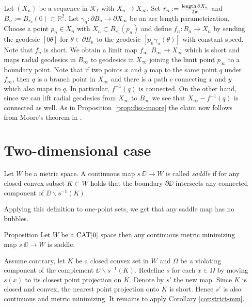 \documentclass[a4paper,10pt]{amsart}
\begin{document}
Let $(X_n)$ be a sequence in $\mathcal{K}_\ell$ with $X_n\to X_\infty$. Set $r_n:=\frac{\mathop{\rm length}\nolimits\partial X_n}{2\pi}$ and $B_n:=B_{r_n}(0)\subset \mathbb{R}^2$.
Let $\gamma_n:\partial B_n\to\partial X_\infty$ be an arc length parametrization. Choose a point $p_n\in X_n$ with $X_n\subset B_{r_n}(p_n)$ and define
$f_n:B_n\to X_n$ by sending the geodesic $[0\theta]$ for $\theta\in\partial B_n$ to the geodesic $[p_n\gamma_n(\theta)]$ with constant speed. Note that $f_n$ is short.
We obtain a limit map $f_\infty:B_\infty\to X_\infty$ which is short and maps radial geodesics in $B_\infty$ to geodesics in $X_\infty$ joining the limit point $p_\infty$
to a boundary point. Note that if two points $x$  and $y$ map to the same point $q$ under $f_\infty$, then $q$ is a branch point in $X_\infty$ and there is a path $c$ connecting 
$x$ and $y$ which also maps to $q$. In particular, $f^{-1}(q)$ is connected. On the other hand, since we can lift radial geodesics from $X_\infty$ to $B_\infty$ we see that $X_\infty-f^{-1}(q)$
is connected as well. As in Proposition~\ref{prop:disc-moore} the claim now follows from Moore's theorem in \cite{moore}.
\qeds


\section{Two-dimensional case}

Let $W$ be a metric space.
A continuous map $s\:\DD\to W$ is called \emph{saddle} if for any closed convex subset $K\subset W$ holds that
the boundary $\partial \DD$ intersects
any connected component of $\DD\backslash s^{-1}(K)$.

Applying this definition to one-point sets,
we get that any saddle map has no bubbles.


\begin{thm}{Proposition}\label{prop:memisaddle}
Let $W$ be a $\mathop{\rm CAT}\nolimits[0]$ space then any continuous metric minimizing map $s\:\DD\to W$ is saddle.
\end{thm}

Assume contrary, let $K$ be a closed convex set in $W$
and $\Omega$ be a violating component of the complement $\DD\backslash s^{-1}(K)$. 
Redefine $s$ for each $x\in\Omega$ by moving 
$s(x)$ to its closest point projection on $K$.
Denote by $s'$ the new map. Since $K$ is closed and convex, the nearest point projection onto $K$ is short.
Hence $s'$ is also continuous and metric minimizing. It remains to apply Corollary \ref{cor:strict-mm}.
\qeds
\end{document}
